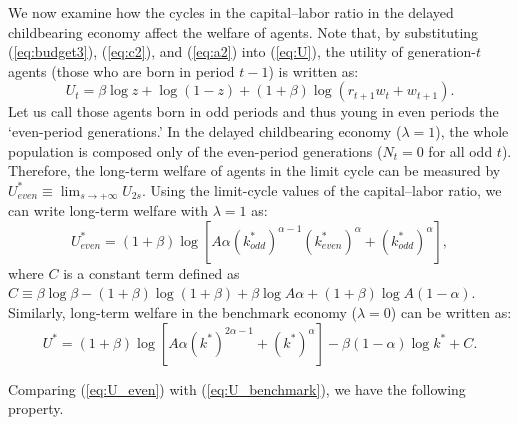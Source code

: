 \documentclass{MBE}%
\begin{document}
{We now examine how the cycles in the capital--labor ratio in the delayed
childbearing economy affect the welfare of agents. Note that, by substituting
(\ref{eq:budget3}), (\ref{eq:c2}), and (\ref{eq:a2}) into (\ref{eq:U}), the
utility of generation-$t$ agents (those who are born in period $t-1$) is
written as:
\begin{equation}
U_{t}=\beta\log z+\log(1-z)+(1+\beta)\log\left(  r_{t+1}w_{t}+w_{t+1}\right). \label{eq:welfare}%
\end{equation}
Let us call those agents born in odd periods and thus young in even periods
the `even-period generations.' In the delayed childbearing economy
($\lambda=1$), the whole population is composed only of the even-period
generations ($N_{t}=0$ for all odd $t$). Therefore, the long-term welfare of
agents in the limit cycle can be measured by $U_{even}^{\ast}\equiv
\lim_{s\rightarrow+\infty}U_{2s}$. Using the limit-cycle values of the
capital--labor ratio, we can write long-term welfare with $\lambda=1$ as:
\begin{equation}
U_{even}^{\ast}=\left(  1+\beta\right)  \log[A\alpha\left(  k_{odd}^{\ast
}\right)  ^{\alpha-1}\left(  k_{even}^{\ast}\right)  ^{\alpha}+\left(
k_{odd}^{\ast}\right)  ^{\alpha}], \label{eq:U_even}%
\end{equation}
where $C$ is a constant term defined as $C\equiv\beta\log\beta-(1+\beta
)\log(1+\beta)+\beta\log A\alpha+(1+\beta)\log A\left(  1-\alpha\right)  $.
Similarly, long-term welfare in the benchmark economy ($\lambda=0$) can be
written as:
\begin{equation}
U^{\ast}=\left(  1+\beta\right)  \log[A\alpha\left(  k^{\ast}\right)
^{2\alpha-1}+\left(  k^{\ast}\right)  ^{\alpha}]-\beta\left(  1-\alpha\right)
\log k^{\ast}+C. \label{eq:U_benchmark}%
\end{equation}


Comparing (\ref{eq:U_even}) with (\ref{eq:U_benchmark}), we have the following property.

%

}
\end{document}

